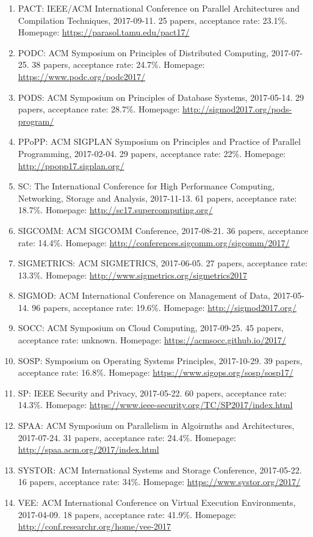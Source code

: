\documentclass{article}
\begin{document}
\begin{enumerate}
\item PACT: IEEE/ACM International Conference on Parallel Architectures and Compilation Techniques, 2017-09-11. 25 papers, acceptance rate: 23.1\%. Homepage: \url{https://parasol.tamu.edu/pact17/}
\item PODC: ACM Symposium on Principles of Distributed Computing, 2017-07-25. 38 papers, acceptance rate: 24.7\%. Homepage: \url{https://www.podc.org/podc2017/}
\item PODS: ACM Symposium on Principles of Database Systems, 2017-05-14. 29 papers, acceptance rate: 28.7\%. Homepage: \url{http://sigmod2017.org/pods-program/}
\item PPoPP: ACM SIGPLAN Symposium on Principles and Practice of Parallel Programming, 2017-02-04. 29 papers, acceptance rate: 22\%. Homepage: \url{http://ppopp17.sigplan.org/}
\item SC: The International Conference for High Performance Computing, Networking, Storage and Analysis, 2017-11-13. 61 papers, acceptance rate: 18.7\%. Homepage: \url{http://sc17.supercomputing.org/}
\item SIGCOMM: ACM SIGCOMM Conference, 2017-08-21. 36 papers, acceptance rate: 14.4\%. Homepage: \url{http://conferences.sigcomm.org/sigcomm/2017/}
\item SIGMETRICS: ACM SIGMETRICS, 2017-06-05. 27 papers, acceptance rate: 13.3\%. Homepage: \url{http://www.sigmetrics.org/sigmetrics2017}
\item SIGMOD: ACM International Conference on Management of Data, 2017-05-14. 96 papers, acceptance rate: 19.6\%. Homepage: \url{http://sigmod2017.org/}
\item SOCC: ACM Symposium on Cloud Computing, 2017-09-25. 45 papers, acceptance rate: unknown. Homepage: \url{https://acmsocc.github.io/2017/}
\item SOSP: Symposium on Operating Systems Principles, 2017-10-29. 39 papers, acceptance rate: 16.8\%. Homepage: \url{https://www.sigops.org/sosp/sosp17/}
\item SP: IEEE Security and Privacy, 2017-05-22. 60 papers, acceptance rate: 14.3\%. Homepage: \url{https://www.ieee-security.org/TC/SP2017/index.html}
\item SPAA: ACM Symposium on Parallelism in Algoirmths and Architectures, 2017-07-24. 31 papers, acceptance rate: 24.4\%. Homepage: \url{http://spaa.acm.org/2017/index.html}
\item SYSTOR: ACM International Systems and Storage Conference, 2017-05-22. 16 papers, acceptance rate: 34\%. Homepage: \url{https://www.systor.org/2017/}
\item VEE: ACM International Conference on Virtual Execution Environments, 2017-04-09. 18 papers, acceptance rate: 41.9\%. Homepage: \url{http://conf.researchr.org/home/vee-2017}

\end{enumerate}
\end{document}
